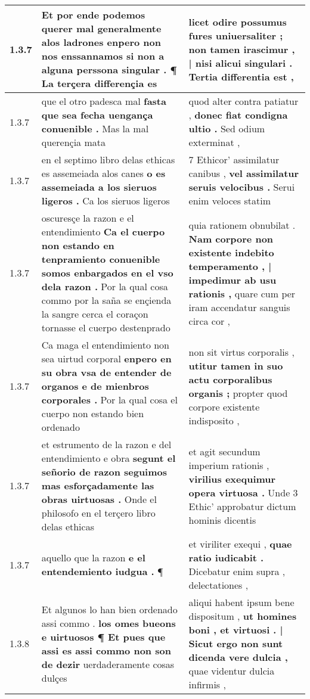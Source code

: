 \begin{tabular}{|p{1cm}|p{6.5cm}|p{6.5cm}|}
1.3.7 & Et por ende podemos querer mal generalmente alos ladrones \textbf{ enpero non nos enssannamos si non a alguna perssona singular . } ¶ La terçera differençia es & licet odire possumus fures uniuersaliter ; \textbf{ non tamen irascimur , | nisi alicui singulari . } Tertia differentia est , \\\hline
1.3.7 & que el otro padesca mal \textbf{ fasta que sea fecha uengança conuenible . } Mas la mal querençia mata & quod alter contra patiatur , \textbf{ donec fiat condigna ultio . } Sed odium exterminat , \\\hline
1.3.7 & en el septimo libro delas ethicas es assemeiada alos canes \textbf{ o es assemeiada a los sieruos ligeros . } Ca los sieruos ligeros & 7 Ethicor’ assimilatur canibus , \textbf{ vel assimilatur seruis velocibus . } Serui enim veloces statim \\\hline
1.3.7 & oscuresçe la razon e el entendimiento \textbf{ Ca el cuerpo non estando en tenpramiento conuenible somos enbargados en el vso dela razon . } Por la qual cosa commo por la saña se ençienda la sangre cerca el coraçon tornasse el cuerpo destenprado & quia rationem obnubilat . \textbf{ Nam corpore non existente indebito temperamento , | impedimur ab usu rationis , } quare cum per iram accendatur sanguis circa cor , \\\hline
1.3.7 & Ca maga el entendimiento non sea uirtud corporal \textbf{ enpero en su obra vsa de entender de organos e de mienbros corporales . } Por la qual cosa el cuerpo non estando bien ordenado & non sit virtus corporalis , \textbf{ utitur tamen in suo actu corporalibus organis ; } propter quod corpore existente indisposito , \\\hline
1.3.7 & et estrumento de la razon e del entendimiento e obra \textbf{ segunt el señorio de razon seguimos mas esforçadamente las obras uirtuosas . } Onde el philosofo en el terçero libro delas ethicas & et agit secundum imperium rationis , \textbf{ virilius exequimur opera virtuosa . } Unde 3 Ethic’ approbatur dictum hominis dicentis \\\hline
1.3.7 & aquello que la razon \textbf{ e el entendemiento iudgua . } ¶ & et viriliter exequi , \textbf{ quae ratio iudicabit . } Dicebatur enim supra , delectationes , \\\hline
1.3.8 & Et algunos lo han bien ordenado assi commo . \textbf{ los omes bueons e uirtuosos ¶ Et pues que assi es assi commo non son de dezir } uerdaderamente cosas dulçes & aliqui habent ipsum bene dispositum , \textbf{ ut homines boni , et virtuosi . | Sicut ergo non sunt dicenda vere dulcia , } quae videntur dulcia infirmis , \\\hline

\end{tabular}
